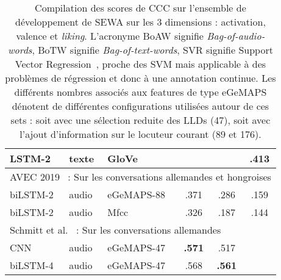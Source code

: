 \begin{table}[]
\begin{tabular}{| l | l | l | c | c | c |}
       LSTM-2     &texte &GloVe          &  & &.413 \\
        \hline
        \multicolumn{6}{|l|}{AVEC 2019~\cite{AVEC2019} : Sur les conversations allemandes et hongroises} \\
        \hline
        biLSTM-2 &audio &eGeMAPS-88  &.371 &.286 &.159 \\
        biLSTM-2 &audio &Mfcc        &.326 &.187 &.144 \\
         \hline
       \multicolumn{6}{|l|}{Schmitt et al.~\cite{Schmitt2019} : Sur les conversations allemandes} \\
       \hline
       \rowcolor{Red}
       CNN      &audio &eGeMAPS-47    &\textbf{.571}  &.517 & \\
       \rowcolor{Red}
       biLSTM-4 &audio &eGeMAPS-47    &.568  &\textbf{.561} & \\
       \hline
    \end{tabular}
    \caption{Compilation des scores de CCC sur l'ensemble de développement de SEWA sur les 3 dimensions : activation, valence et \textit{liking}. L'acronyme BoAW signifie \textit{Bag-of-audio-words}, BoTW signifie \textit{Bag-of-text-words}, SVR signifie Support Vector Regression~\cite{Smola2004}, proche des SVM mais applicable à des problèmes de régression et donc à une annotation continue. Les différents nombres associés aux features de type eGeMAPS dénotent de différentes configurations utilisées autour de ces sets : soit avec une sélection reduite des LLDs (47), soit avec l'ajout d'information sur le locuteur courant (89 et 176).}
    \label{tab:avec}
\end{table}
